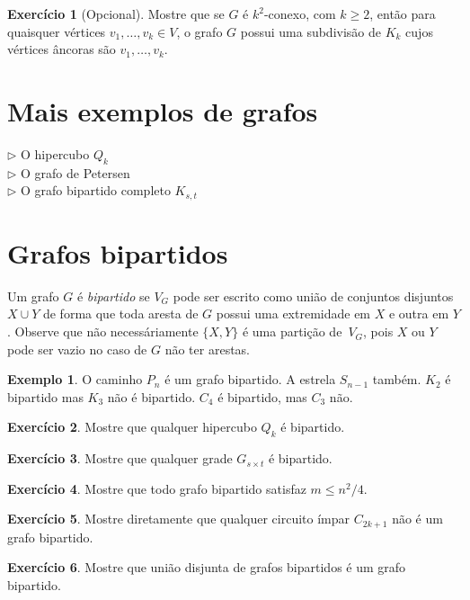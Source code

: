 \documentclass[12pt, a4paper]{article}
\theoremstyle{definition}
\newtheorem{exem}[teor]{Exemplo}
\newtheorem{exer}{Exercício}
\begin{document}
\begin{exer}[Opcional]
  Mostre que se $G$ é $k^2$-conexo, com $k \geq 2$, então para quaisquer vértices $v_1,\dots,v_k \in V$, o grafo $G$ possui uma subdivisão de $K_k$ cujos vértices âncoras são $v_1,\dots,v_k$.  
\end{exer}

\section{Mais exemplos de grafos}

$\rhd$ O hipercubo $Q_k$\\
$\rhd$ O grafo de Petersen\\
$\rhd$ O grafo bipartido completo $K_{s,t}$


\section {Grafos bipartidos}

Um grafo $G$ é \emph{bipartido} se $V_G$ pode ser escrito como união de conjuntos disjuntos $X \cup Y$ de forma que toda aresta de $G$ possui uma extremidade em $X$ e outra em $Y$. Observe que não necessáriamente $\{X,Y\}$ é uma partição de~$V_G$, pois $X$ ou $Y$ pode ser vazio no caso de $G$ não ter arestas.

\begin{exem}
O caminho $P_n$ é um grafo bipartido. A estrela $S_{n-1}$ também. $K_2$ é bipartido mas $K_3$ não é bipartido. $C_4$ é bipartido, mas $C_3$ não.
\end{exem}

\begin{exer}
Mostre que qualquer hipercubo $Q_k$ é bipartido. 
\end{exer}

\begin{exer}
Mostre que qualquer grade $G_{s \times t}$ é bipartido.
\end{exer}

\begin{exer}
Mostre que todo grafo bipartido satisfaz $m \leq n^2/4$.
\end{exer}

\begin{exer}
\label{exer:cimpar}
Mostre diretamente que qualquer circuito ímpar $C_{2k+1}$ não é um grafo bipartido.
\end{exer}

\begin{exer}
\label{exer:uni_bip}
Mostre que união disjunta de grafos bipartidos é um grafo bipartido.
\end{exer}
\end{document}
